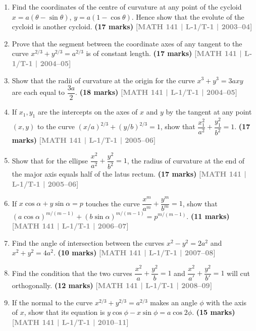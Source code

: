 \documentclass[12pt,a4paper]{article}
\newcommand{\yr}[1]{\hfill\textcolor{gray}{\small\textbf{[#1]}}}
\newcommand{\mk}[1]{\textcolor{orange!70!black}{\small\textbf{(#1 marks)}}}
\begin{document}
\begin{enumerate}

\item Find the coordinates of the centre of curvature at any point of the cycloid $x=a(\theta-\sin\theta)$, $y=a(1-\cos\theta)$. Hence show that the evolute of the cycloid is another cycloid.
\mk{17} \yr{MATH 141 | L-1/T-1 | 2003--04}


\item Prove that the segment between the coordinate axes of any tangent to the curve $x^{2/3}+y^{2/3}=a^{2/3}$ is of constant length.
\mk{17} \yr{MATH 141 | L-1/T-1 | 2004--05}

\item Show that the radii of curvature at the origin for the curve $x^{3}+y^{3}=3axy$ are each equal to $\dfrac{3a}{2}$.
\mk{18} \yr{MATH 141 | L-1/T-1 | 2004--05}

\item If $x_{1},y_{1}$ are the intercepts on the axes of $x$ and $y$ by the tangent at any point $(x,y)$ to the curve $(x/a)^{2/3}+(y/b)^{2/3}=1$, show that $\dfrac{x_{1}^{2}}{a^{2}}+\dfrac{y_{1}^{2}}{b^{2}}=1$.
\mk{17} \yr{MATH 141 | L-1/T-1 | 2005--06}

\item Show that for the ellipse $\dfrac{x^{2}}{a^{2}}+\dfrac{y^{2}}{b^{2}}=1$, the radius of curvature at the end of the major axis equals half of the latus rectum.
\mk{17} \yr{MATH 141 | L-1/T-1 | 2005--06}

\item If $x\cos\alpha+y\sin\alpha=p$ touches the curve $\dfrac{x^{m}}{a^{m}}+\dfrac{y^{m}}{b^{m}}=1$, show that $(a\cos\alpha)^{m/(m-1)}+(b\sin\alpha)^{m/(m-1)}=p^{m/(m-1)}$.
\mk{11} \yr{MATH 141 | L-1/T-1 | 2006--07}

\item Find the angle of intersection between the curves $x^{2}-y^{2}=2a^{2}$ and $x^{2}+y^{2}=4a^{2}$.
\mk{10} \yr{MATH 141 | L-1/T-1 | 2007--08}

\item Find the condition that the two curves $\dfrac{x^{2}}{a}+\dfrac{y^{2}}{b}=1$ and $\dfrac{x^{2}}{a'}+\dfrac{y^{2}}{b'}=1$ will cut orthogonally.
\mk{12} \yr{MATH 141 | L-1/T-1 | 2008--09}

\item If the normal to the curve $x^{2/3}+y^{2/3}=a^{2/3}$ makes an angle $\phi$ with the axis of $x$, show that its equation is $y\cos\phi-x\sin\phi=a\cos 2\phi$.
\mk{15} \yr{MATH 141 | L-1/T-1 | 2010--11}


\end{enumerate}
\end{document}
